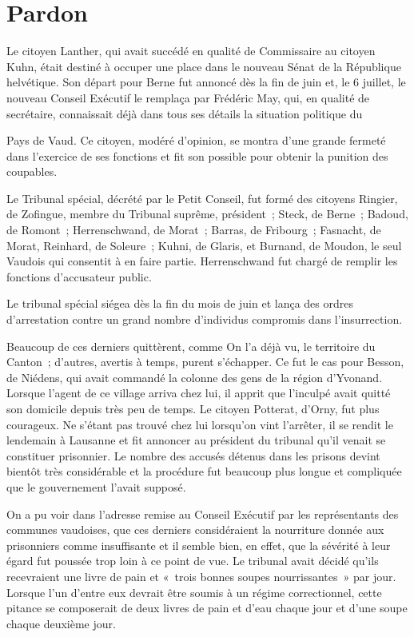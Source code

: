 \documentclass[french,twoside]{book} %
\begin{document}
\section[{Pardon}]{Pardon}
\noindent Le citoyen Lanther, qui avait succédé en qualité de Commissaire au citoyen Kuhn, était destiné à occuper une place dans le nouveau Sénat de la République helvétique. Son départ pour Berne fut annoncé dès la fin de juin et, le 6 juillet, le nouveau Conseil Exécutif le remplaça par Frédéric May, qui, en qualité de secrétaire, connaissait déjà dans tous ses détails la situation politique du\par
Pays de Vaud. Ce citoyen, modéré d’opinion, se montra d’une grande fermeté dans l’exercice de ses fonctions et fit son possible pour obtenir la punition des coupables.\par
Le Tribunal spécial, décrété par le Petit Conseil, fut formé des citoyens Ringier, de Zofingue, membre du Tribunal suprême, président ; Steck, de Berne ; Badoud, de Romont ; Herrenschwand, de Morat ; Barras, de Fribourg ; Fasnacht, de Morat, Reinhard, de Soleure ; Kuhni, de Glaris, et Burnand, de Moudon, le seul Vaudois qui consentit à en faire partie. Herrenschwand fut chargé de remplir les fonctions d’accusateur public.\par
Le tribunal spécial siégea dès la fin du mois de juin et lança des ordres d’arrestation contre un grand nombre d’individus compromis dans l’insurrection.\par
Beaucoup de ces derniers quittèrent, comme On l’a déjà vu, le territoire du Canton ; d’autres, avertis à temps, purent s’échapper. Ce fut le cas pour Besson, de Niédens, qui avait commandé la colonne des gens de la région d’Yvonand. Lorsque l’agent de ce village arriva chez lui, il apprit que l’inculpé avait quitté son domicile depuis très peu de temps. Le citoyen Potterat, d’Orny, fut plus courageux. Ne s’étant pas trouvé chez lui lorsqu’on vint l’arrêter, il se rendit le lendemain à Lausanne et fit annoncer au président du tribunal qu’il venait se constituer prisonnier. Le nombre des accusés détenus dans les prisons devint bientôt très considérable et la procédure fut beaucoup plus longue et compliquée que le gouvernement l’avait supposé.\par
On a pu voir dans l’adresse remise au Conseil Exécutif par les représentants des communes vaudoises, que ces derniers considéraient la nourriture donnée aux prisonniers comme insuffisante et il semble bien, en effet, que la sévérité à leur égard fut poussée trop loin à ce point de vue. Le tribunal avait décidé qu’ils recevraient une livre de pain et « trois bonnes soupes nourrissantes » par jour. Lorsque l’un d’entre eux devrait être soumis à un régime correctionnel, cette pitance se composerait de deux livres de pain et d’eau chaque jour et d’une soupe chaque deuxième jour.\par
\end{document}
